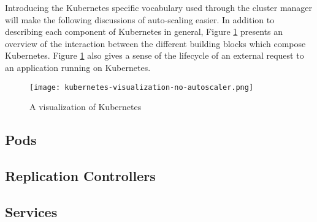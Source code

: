 Introducing the Kubernetes specific vocabulary used through the cluster manager
will make the following discussions of auto-scaling easier. In addition to
describing each component of Kubernetes in general, Figure
\ref{fig:kubernetes-visualization-no-autoscaler} presents an overview of the
interaction between the different building blocks which compose Kubernetes.
Figure \ref{fig:kubernetes-visualization-no-autoscaler} also gives a sense of
the lifecycle of an external request to an application running on Kubernetes.

\begin{figure}[!h]
  \centerline{\texttt{[image: kubernetes-visualization-no-autoscaler.png]}}
  \caption{A visualization of Kubernetes}
  \label{fig:kubernetes-visualization-no-autoscaler}
\end{figure}

\subsection{Pods}



\subsection{Replication Controllers}



\subsection{Services}


